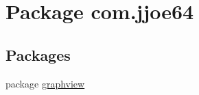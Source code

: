 \hypertarget{namespacecom_1_1jjoe64}{}\section{Package com.\+jjoe64}
\label{namespacecom_1_1jjoe64}
\subsection*{Packages}
\begin{DoxyCompactItemize}
\item 
package \mbox{\hyperlink{namespacecom_1_1jjoe64_1_1graphview}{graphview}}
\end{DoxyCompactItemize}
